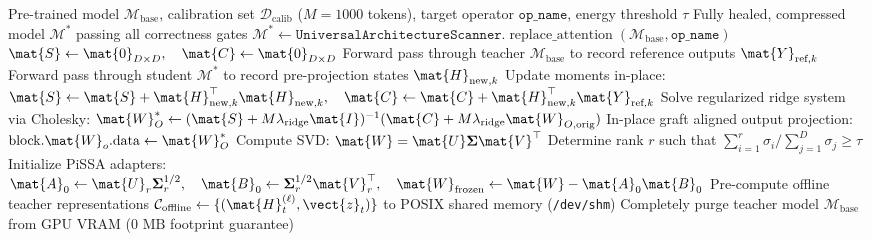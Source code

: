 \begin{algorithm}[t]
\caption[Four-Stage End-to-End Surgical Calibration and Distillation Protocol]{Four-Stage End-to-End Surgical Calibration and Distillation Protocol}
\label{alg:four_stage_protocol}
\begin{algorithmic}[1]
\REQUIRE Pre-trained model $\mathcal{M}_{\text{base}}$, calibration set $\mathcal{D}_{\text{calib}}$ ($M=1000$ tokens), target operator $\texttt{op\_name}$, energy threshold $\tau$
\ENSURE Fully healed, compressed model $\mathcal{M}^*$ passing all correctness gates
\STATE {}
\STATE $\mathcal{M}^* \leftarrow \texttt{UniversalArchitectureScanner}.\operatorname{replace\_attention}(\mathcal{M}_{\text{base}}, \texttt{op\_name})$
\STATE {}
\STATE $\mat{S} \leftarrow \mat{0}_{D \times D}, \quad \mat{C} \leftarrow \mat{0}_{D \times D}$
    \STATE Forward pass through teacher $\mathcal{M}_{\text{base}}$ to record reference outputs $\mat{Y}_{\text{ref}, k}$
    \STATE Forward pass through student $\mathcal{M}^*$ to record pre-projection states $\mat{H}_{\text{new}, k}$
    \STATE Update moments in-place: $\mat{S} \leftarrow \mat{S} + \mat{H}_{\text{new}, k}^\top \mat{H}_{\text{new}, k}, \quad \mat{C} \leftarrow \mat{C} + \mat{H}_{\text{new}, k}^\top \mat{Y}_{\text{ref}, k}$
\ENDFOR
{}
    \STATE Solve regularized ridge system via Cholesky: $\mat{W}_O^* \leftarrow (\mat{S} + M \lambda_{\text{ridge}} \mat{I})^{-1} (\mat{C} + M \lambda_{\text{ridge}} \mat{W}_{O, \text{orig}})$
    \STATE In-place graft aligned output projection: $\text{block}.\mat{W}_o.\text{data} \leftarrow \mat{W}_O^*$
\ENDFOR
\STATE {}
    \STATE Compute SVD: $\mat{W} = \mat{U} \boldsymbol{\Sigma} \mat{V}^\top$
    \STATE Determine rank $r$ such that $\sum_{i=1}^r \sigma_i / \sum_{j=1}^D \sigma_j \ge \tau$
    \STATE Initialize PiSSA adapters: $\mat{A}_0 \leftarrow \mat{U}_r \boldsymbol{\Sigma}_r^{1/2}, \quad \mat{B}_0 \leftarrow \boldsymbol{\Sigma}_r^{1/2} \mat{V}_r^\top, \quad \mat{W}_{\text{frozen}} \leftarrow \mat{W} - \mat{A}_0 \mat{B}_0$
\ENDFOR
\STATE Pre-compute offline teacher representations $\mathcal{C}_{\text{offline}} \leftarrow \{(\mat{H}_t^{(\ell)}, \vect{z}_t)\}$ to POSIX shared memory (\texttt{/dev/shm})
\STATE Completely purge teacher model $\mathcal{M}_{\text{base}}$ from GPU VRAM ($0\text{ MB}$ footprint guarantee)

\end{algorithmic}
\end{algorithm}
